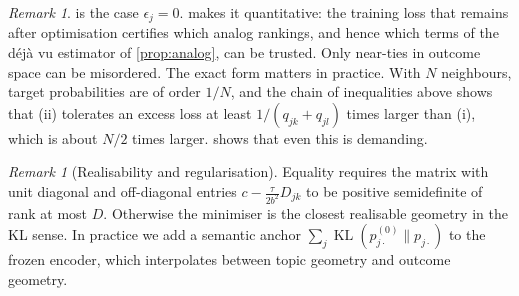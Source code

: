 \documentclass[11pt,a4paper]{article}
\theoremstyle{plain}
\theoremstyle{definition}
\theoremstyle{remark}
\newtheorem{remark}[theorem]{Remark}
\DeclareMathOperator{\KL}{KL}
\begin{document}
\begin{remark}
 is the case $\epsilon_j=0$.  makes it quantitative: the training loss that remains after optimisation certifies which analog rankings, and hence which terms of the d\'ej\`a vu estimator of \cref{prop:analog}, can be trusted. Only near-ties in outcome space can be misordered. The exact form matters in practice. With $N$ neighbours, target probabilities are of order $1/N$, and the chain of inequalities above shows that (ii) tolerates an excess loss at least $1/(q_{jk}+q_{jl})$ times larger than (i), which is about $N/2$ times larger.  shows that even this is demanding.
\end{remark}


\begin{remark}[Realisability and regularisation]
Equality requires the matrix with unit diagonal and off-diagonal entries $c-\frac{\tau}{2b^2}D_{jk}$ to be positive semidefinite of rank at most $D$. Otherwise the minimiser is the closest realisable geometry in the KL sense. In practice we add a semantic anchor $\sum_j\KL(p^{(0)}_{j\cdot}\|p_{j\cdot})$ to the frozen encoder, which interpolates between topic geometry and outcome geometry.
\end{remark}
\end{document}
